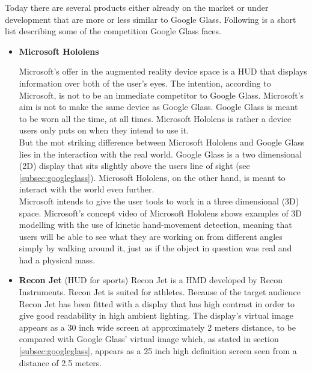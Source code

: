 Today there are several products either already on the market or under development that are more or less similar to Google Glass. Following is a short list describing some of the competition Google Glass faces.

\begin{itemize}
\item \textbf{Microsoft Hololens}

Microsoft's offer in the augmented reality device space is a HUD that displays information over both of the user's eyes.\cite{hololens} The intention, according to Microsoft, is not to be an immediate competitor to Google Glass. Microsoft's aim is not to make the same device as Google Glass. Google Glass is meant to be worn all the time, at all times. Microsoft Hololens is rather a device users only puts on when they intend to use it.\\

But the mot striking difference between Microsoft Hololens and Google Glass lies in the interaction with the real world. Google Glass is a two dimensional (2D) display that sits slightly above the users line of sight (see \ref{subsec:googleglass}). Microsoft Hololens, on the other hand, is meant to interact with the world even further. \\

Microsoft intends to give the user tools to work in a three dimensional (3D) space. Microsoft's concept video\cite{hololensConceptVideo} of Microsoft Hololens shows examples of 3D modelling with the use of kinetic hand-movement detection, meaning that users will be able to see what they are working on from different angles simply by walking around it, just as if the object in question was real and had a physical mass.\\

\item \textbf{Recon Jet}\cite{reconJet} (HUD for sports)
Recon Jet is a HMD developed by Recon Instruments. Recon Jet is suited for athletes. Because of the target audience Recon Jet has been fitted with a display that has high contrast in order to give good readability in high ambient lighting. The display's virtual image appears as  a 30 inch wide screen at approximately 2 meters distance,\cite{reconJetSpecs} to be compared with Google Glass' virtual image which, as stated in section \ref{subsec:googleglass},  appears as a 25 inch high definition screen seen from a distance of 2.5 meters.
\\
\\


\end{itemize}
